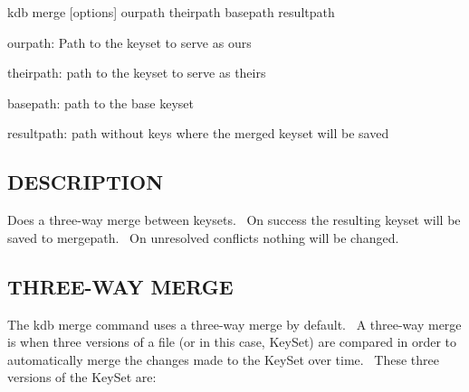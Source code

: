 {\ttfamily kdb merge \mbox{[}options\mbox{]} ourpath theirpath basepath resultpath}~\newline



\begin{DoxyItemize}
\item ourpath\+: Path to the keyset to serve as {\ttfamily ours}~\newline

\item theirpath\+: path to the keyset to serve as {\ttfamily theirs}~\newline

\item basepath\+: path to the {\ttfamily base} keyset~\newline

\item resultpath\+: path without keys where the merged keyset will be saved~\newline

\end{DoxyItemize}

\subsection*{D\+E\+S\+C\+R\+I\+P\+T\+I\+ON}

Does a three-\/way merge between keysets.~\newline
 On success the resulting keyset will be saved to mergepath.~\newline
 On unresolved conflicts nothing will be changed.~\newline


\subsection*{T\+H\+R\+E\+E-\/\+W\+AY M\+E\+R\+GE}

The {\ttfamily kdb merge} command uses a three-\/way merge by default.~\newline
 A three-\/way merge is when three versions of a file (or in this case, Key\+Set) are compared in order to automatically merge the changes made to the Key\+Set over time.~\newline
 These three versions of the Key\+Set are\+:~\newline



